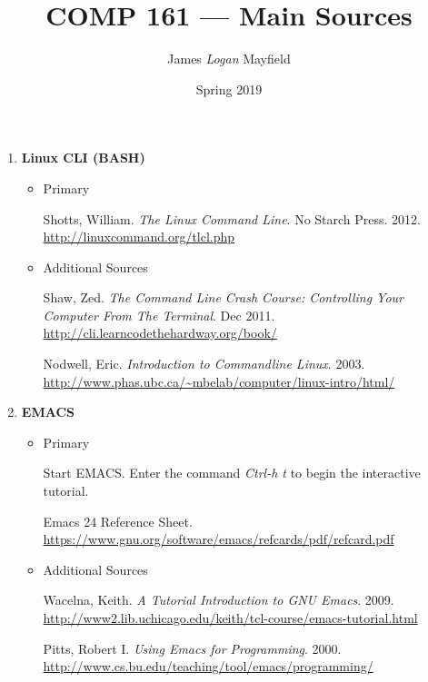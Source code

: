 \documentclass[10pt]{article}
\title{COMP 161 --- Main Sources}
\author{ James \textit{Logan} Mayfield }
\date{Spring 2019}
\begin{document}
\maketitle

\begin{enumerate}
\item \textbf{Linux CLI (BASH)}
\begin{itemize}
\item Primary

Shotts, William. \textit{The Linux Command Line}. No Starch Press. 2012.
\newline \url{http://linuxcommand.org/tlcl.php}

\vspace{.25in}

\item Additional Sources

Shaw, Zed. \textit{The Command Line Crash Course: Controlling Your Computer From The Terminal}. Dec 2011.
\newline \url{http://cli.learncodethehardway.org/book/}

\vspace{.25in}

Nodwell, Eric. \textit{Introduction to Commandline Linux}. 2003.
\newline \url{http://www.phas.ubc.ca/~mbelab/computer/linux-intro/html/}
\vspace{.25in}
\end{itemize}

\item \textbf{EMACS}
\begin{itemize}
\item Primary

Start EMACS\@. Enter the command \textit{Ctrl-h t} to begin the interactive tutorial.
\vspace{.25in}

Emacs 24 Reference Sheet. \newline
\url{https://www.gnu.org/software/emacs/refcards/pdf/refcard.pdf}
\vspace{.25in}

\item Additional Sources

Wacelna, Keith. \textit{A Tutorial Introduction to GNU Emacs}. 2009.
\newline \url{http://www2.lib.uchicago.edu/keith/tcl-course/emacs-tutorial.html}
\vspace{.25in}

Pitts, Robert I. \textit{Using Emacs for Programming}. 2000.
\newline \url{http://www.cs.bu.edu/teaching/tool/emacs/programming/}
\vspace{.25in}


\end{itemize}
\end{enumerate}
\end{document}
